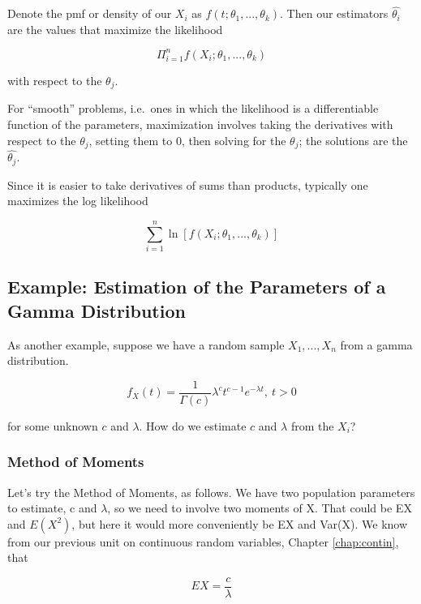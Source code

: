 Denote the pmf or density of our $X_i$ as $f(t;\theta_1,...,\theta_k)$.
Then our estimators $\widehat{\theta_i}$ are the values that maximize
the likelihood

\begin{equation}
\Pi_{i=1}^n f(X_i; \theta_1,...,\theta_k)
\end{equation}

with respect to the $\theta_j$.  

For ``smooth'' problems, i.e.\ ones in which the likelihood is a
differentiable function of the parameters, maximization involves taking
the derivatives with respect to the $\theta_j$, setting them to 0, then
solving for the $\theta_j$; the solutions are the
$\widehat{\theta_j}$.  

Since it is easier to take derivatives of sums than products, typically
one maximizes the log likelihood

\begin{equation}
\label{loglike}
\sum_{i=1}^n \ln[f(X_i; \theta_1,...,\theta_k)]
\end{equation}

\subsection{Example:  Estimation of the Parameters of a Gamma Distribution}
\label{gammamle}

As another example, suppose we have a random sample $X_1,...,X_n$ from 
a gamma distribution.

\begin{equation}
\label{gamma}
f_X(t) = \frac{1}{\Gamma(c)} \lambda^c t^{c-1} e^{-\lambda t}, ~ t > 0
\end{equation}

for some unknown $c$ and $\lambda$.  How do we estimate $c$ and
$\lambda$ from the $X_i$?

\subsubsection{Method of Moments}

Let's try the Method of Moments, as follows.  We have two population
parameters to estimate, c and $\lambda$, so we need to involve two
moments of X.  That could be EX and $E(X^2)$, but here it would more
conveniently be EX and Var(X).  We know from our previous unit on
continuous random variables, Chapter \ref{chap:contin}, that 

\begin{equation}
EX = \frac{c}{\lambda}
\end{equation}

